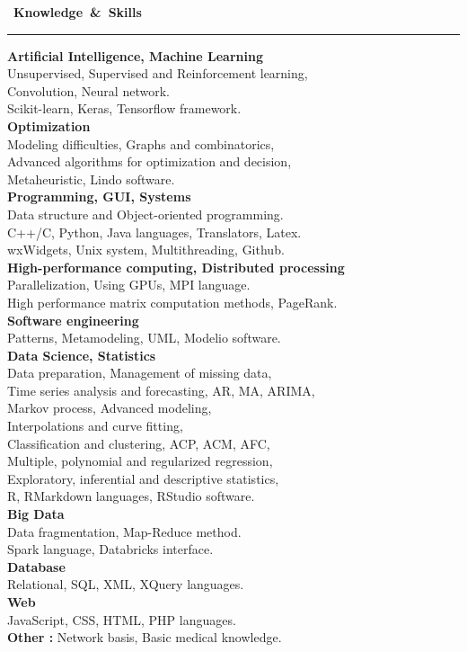 \documentclass[a4paper]{article}
\begin{document}
\begin{titlepage}
\mbox{\Large \comfortaa \textbf{ \faToolbox \hspace{0.2cm} Knowledge \& Skills}}\\
\rule{0.8\linewidth}{0.01mm}
\begin{multicols}{2}
\textbf{Artificial Intelligence, Machine Learning}\\
Unsupervised, Supervised and Reinforcement learning,\\
Convolution, Neural network.\\
Scikit-learn, Keras, Tensorflow framework.\\[0.2cm]
\textbf{Optimization}\\
Modeling difficulties, Graphs and combinatorics,\\
Advanced algorithms for optimization and decision,\\
Metaheuristic, Lindo software.\\[0.2cm]
\textbf{Programming, GUI, Systems}\\
Data structure and Object-oriented programming.\\
C++/C, Python, Java languages, Translators, Latex.\\
wxWidgets, Unix system, Multithreading, Github.\\[0.2cm]
\textbf{High-performance computing, Distributed processing}\\
Parallelization, Using GPUs, MPI language.\\
High performance matrix computation methods, PageRank.\\[0.2cm]
\textbf{Software engineering}\\
Patterns, Metamodeling, UML, Modelio software.\\[0.2cm]
\textbf{Data Science, Statistics}\\
Data preparation, Management of missing data,\\
Time series analysis and forecasting, AR, MA, ARIMA,\\
Markov process, Advanced modeling,\\
Interpolations and curve fitting,\\
Classification and clustering, ACP, ACM, AFC,\\
Multiple, polynomial and regularized regression,\\
Exploratory, inferential and descriptive statistics,\\
R, RMarkdown languages, RStudio software.\\[0.2cm]
\textbf{Big Data}\\
Data fragmentation, Map-Reduce method.\\
Spark language, Databricks interface.\\[0.2cm]
\textbf{Database}\\
Relational, SQL, XML, XQuery languages.\\[0.2cm]
\textbf{Web}\\
JavaScript, CSS, HTML, PHP languages.\\[0.2cm]
\textbf{Other :} Network basis, Basic medical knowledge.
\end{multicols}


\end{titlepage}
\end{document}
